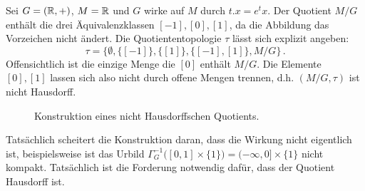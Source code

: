 \begin{beispiel}
Sei $G=(\mathbb{R},+)$, $M=\mathbb{R}$ und $G$ wirke auf $M$ durch $t.x=e^tx$.
Der Quotient $M/G$ enthält die drei Äquivalenzklassen $[-1],[0],[1]$, da die
Abbildung das Vorzeichen nicht ändert.
Die Quotiententopologie $\tau$ lässt sich explizit angeben:
\begin{equation}
\tau =\big\{\emptyset,\{[-1]\},\{[1]\},\{[-1],[1]\},M/G\big\}\,.
\end{equation}
Offensichtlich ist die einzige Menge die $[0]$ enthält $M/G$. Die Elemente
$[0],[1]$ lassen sich also nicht durch offene Mengen trennen, d.h. $(M/G,\tau)$
ist nicht Hausdorff.
\begin{figure}[!htbp]
\centering
{}
\caption{Konstruktion eines nicht Hausdorffschen Quotients.}
\end{figure}
\end{beispiel}
Tatsächlich scheitert die Konstruktion daran, dass die Wirkung nicht eigentlich
ist, beispielsweise ist das Urbild $\Gamma_G^{-1}\big([0,1]\times
\{1\}\big)=(-\infty,0]\times \{1\}$ nicht kompakt.
Tatsächlich ist die Forderung notwendig dafür, dass der Quotient Hausdorff ist.

